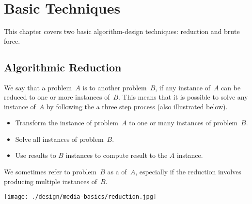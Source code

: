 \chapter{Basic Techniques}
\label{ch:design::basics}

\begin{cluster}
\label{grp:prmbl:design::basics::covers}

\begin{preamble}
\label{prmbl:design::basics::covers}
This chapter covers two basic algorithm-design techniques: reduction and brute force.

\end{preamble}
\end{cluster}


\section{Algorithmic Reduction}
\label{sec:design::reduction}

\begin{cluster}
\label{grp:def:design::reduction}

\begin{definition}
\label{def:design::reduction}
We say that a problem~$A$ is  to another problem~$B$,
if any instance of~$A$ can be reduced to one or more instances of~$B$.
This means that it is possible to solve any instance of~$A$ by
following the a three step process (also illustrated below).
\begin{itemize}
\item Transform the instance of problem~$A$ to one or many instances of problem~$B$.
\item Solve all instances of problem~$B$.
\item Use results to $B$ instances to compute result to
 the $A$ instance.
\end{itemize}
We sometimes refer to problem~$B$ as a  of~$A$,
especially if the reduction involves producing multiple instances
of~$B$.

\begin{center}
\texttt{[image: ./design/media-basics/reduction.jpg]}
\end{center}

\end{definition}
\end{cluster}

